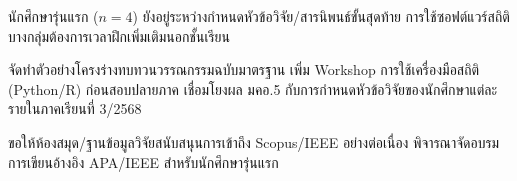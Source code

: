 \documentclass{mko5}
\begin{document}
\closummaryend

\closummaryend

\closummaryend

\mkosectionfour
\begin{mkotextblock}
นักศึกษารุ่นแรก ($n=4$) ยังอยู่ระหว่างกำหนดหัวข้อวิจัย/สารนิพนธ์ขั้นสุดท้าย
การใช้ซอฟต์แวร์สถิติบางกลุ่มต้องการเวลาฝึกเพิ่มเติมนอกชั้นเรียน
\end{mkotextblock}

\mkosectionfive
\begin{mkotextblock}
จัดทำตัวอย่างโครงร่างทบทวนวรรณกรรมฉบับมาตรฐาน
เพิ่ม Workshop การใช้เครื่องมือสถิติ (Python/R) ก่อนสอบปลายภาค
เชื่อมโยงผล มคอ.5 กับการกำหนดหัวข้อวิจัยของนักศึกษาแต่ละรายในภาคเรียนที่ 3/2568
\end{mkotextblock}

\mkosectionsix
\begin{mkotextblock}
ขอให้ห้องสมุด/ฐานข้อมูลวิจัยสนับสนุนการเข้าถึง Scopus/IEEE อย่างต่อเนื่อง
พิจารณาจัดอบรมการเขียนอ้างอิง APA/IEEE สำหรับนักศึกษารุ่นแรก
\end{mkotextblock}

\mkosectionseven
{}
\end{document}
